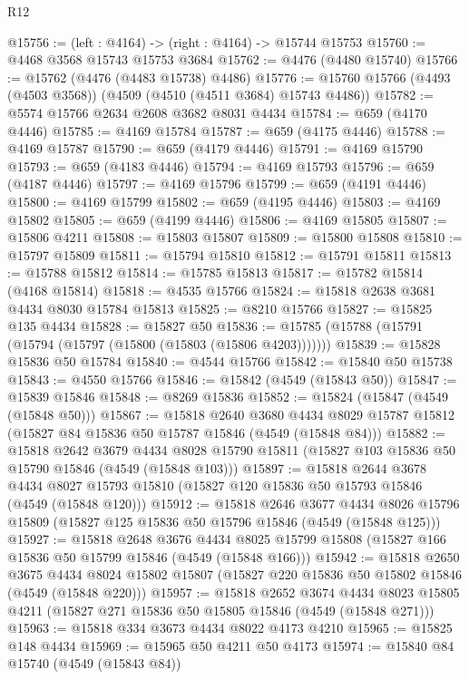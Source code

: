 \begin{lexlean}{R12}
\begin{coremodule}
@15756 := (left : @4164) -> (right : @4164) -> @15744 @15753
@15760 := @4468 @3568 @15743 @15753 @3684
@15762 := @4476 (@4480 @15740)
@15766 := @15762 (@4476 (@4483 @15738) @4486)
@15776 := @15760 @15766 (@4493 (@4503 @3568)) (@4509 (@4510 (@4511 @3684) @15743 @4486))
@15782 := @5574 @15766 @2634 @2608 @3682 @8031 @4434
@15784 := @659 (@4170 @4446)
@15785 := @4169 @15784
@15787 := @659 (@4175 @4446)
@15788 := @4169 @15787
@15790 := @659 (@4179 @4446)
@15791 := @4169 @15790
@15793 := @659 (@4183 @4446)
@15794 := @4169 @15793
@15796 := @659 (@4187 @4446)
@15797 := @4169 @15796
@15799 := @659 (@4191 @4446)
@15800 := @4169 @15799
@15802 := @659 (@4195 @4446)
@15803 := @4169 @15802
@15805 := @659 (@4199 @4446)
@15806 := @4169 @15805
@15807 := @15806 @4211
@15808 := @15803 @15807
@15809 := @15800 @15808
@15810 := @15797 @15809
@15811 := @15794 @15810
@15812 := @15791 @15811
@15813 := @15788 @15812
@15814 := @15785 @15813
@15817 := @15782 @15814 (@4168 @15814)
@15818 := @4535 @15766
@15824 := @15818 @2638 @3681 @4434 @8030 @15784 @15813
@15825 := @8210 @15766
@15827 := @15825 @135 @4434
@15828 := @15827 @50
@15836 := @15785 (@15788 (@15791 (@15794 (@15797 (@15800 (@15803 (@15806 @4203)))))))
@15839 := @15828 @15836 @50 @15784
@15840 := @4544 @15766
@15842 := @15840 @50 @15738
@15843 := @4550 @15766
@15846 := @15842 (@4549 (@15843 @50))
@15847 := @15839 @15846
@15848 := @8269 @15836
@15852 := @15824 (@15847 (@4549 (@15848 @50)))
@15867 := @15818
    @2640
    @3680
    @4434
    @8029
    @15787
    @15812
    (@15827 @84 @15836 @50 @15787 @15846 (@4549 (@15848 @84)))
@15882 := @15818
    @2642
    @3679
    @4434
    @8028
    @15790
    @15811
    (@15827 @103 @15836 @50 @15790 @15846 (@4549 (@15848 @103)))
@15897 := @15818
    @2644
    @3678
    @4434
    @8027
    @15793
    @15810
    (@15827 @120 @15836 @50 @15793 @15846 (@4549 (@15848 @120)))
@15912 := @15818
    @2646
    @3677
    @4434
    @8026
    @15796
    @15809
    (@15827 @125 @15836 @50 @15796 @15846 (@4549 (@15848 @125)))
@15927 := @15818
    @2648
    @3676
    @4434
    @8025
    @15799
    @15808
    (@15827 @166 @15836 @50 @15799 @15846 (@4549 (@15848 @166)))
@15942 := @15818
    @2650
    @3675
    @4434
    @8024
    @15802
    @15807
    (@15827 @220 @15836 @50 @15802 @15846 (@4549 (@15848 @220)))
@15957 := @15818
    @2652
    @3674
    @4434
    @8023
    @15805
    @4211
    (@15827 @271 @15836 @50 @15805 @15846 (@4549 (@15848 @271)))
@15963 := @15818 @334 @3673 @4434 @8022 @4173 @4210
@15965 := @15825 @148 @4434
@15969 := @15965 @50 @4211 @50 @4173
@15974 := @15840 @84 @15740 (@4549 (@15843 @84))

\end{coremodule}
\end{lexlean}
